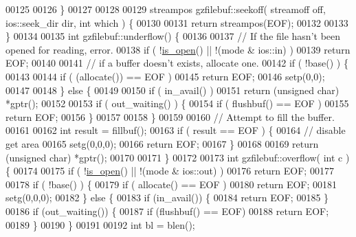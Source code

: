 \begin{DoxyCode}
00125 
00126 \}
00127 
00128 
00129 streampos gzfilebuf::seekoff( streamoff off, ios::seek\_dir dir, \textcolor{keywordtype}{int} which ) \{
00130 
00131   \textcolor{keywordflow}{return} streampos(EOF);
00132 
00133 \}
00134 
00135 \textcolor{keywordtype}{int} gzfilebuf::underflow() \{
00136 
00137   \textcolor{comment}{// If the file hasn't been opened for reading, error.}
00138   \textcolor{keywordflow}{if} ( !\hyperlink{classgzofstream_acb1c9c6dccaf41bc5e44c2263ea48de3}{is\_open}() || !(mode & ios::in) )
00139     \textcolor{keywordflow}{return} EOF;
00140 
00141   \textcolor{comment}{// if a buffer doesn't exists, allocate one.}
00142   \textcolor{keywordflow}{if} ( !base() ) \{
00143 
00144     \textcolor{keywordflow}{if} ( (allocate()) == EOF )
00145       \textcolor{keywordflow}{return} EOF;
00146     setp(0,0);
00147 
00148   \} \textcolor{keywordflow}{else} \{
00149 
00150     \textcolor{keywordflow}{if} ( in\_avail() )
00151       \textcolor{keywordflow}{return} (\textcolor{keywordtype}{unsigned} \textcolor{keywordtype}{char}) *gptr();
00152 
00153     \textcolor{keywordflow}{if} ( out\_waiting() ) \{
00154       \textcolor{keywordflow}{if} ( flushbuf() == EOF )
00155         \textcolor{keywordflow}{return} EOF;
00156     \}
00157 
00158   \}
00159 
00160   \textcolor{comment}{// Attempt to fill the buffer.}
00161 
00162   \textcolor{keywordtype}{int} result = fillbuf();
00163   \textcolor{keywordflow}{if} ( result == EOF ) \{
00164     \textcolor{comment}{// disable get area}
00165     setg(0,0,0);
00166     \textcolor{keywordflow}{return} EOF;
00167   \}
00168 
00169   \textcolor{keywordflow}{return} (\textcolor{keywordtype}{unsigned} \textcolor{keywordtype}{char}) *gptr();
00170 
00171 \}
00172 
00173 \textcolor{keywordtype}{int} gzfilebuf::overflow( \textcolor{keywordtype}{int} c ) \{
00174 
00175   \textcolor{keywordflow}{if} ( !\hyperlink{classgzofstream_acb1c9c6dccaf41bc5e44c2263ea48de3}{is\_open}() || !(mode & ios::out) )
00176     \textcolor{keywordflow}{return} EOF;
00177 
00178   \textcolor{keywordflow}{if} ( !base() ) \{
00179     \textcolor{keywordflow}{if} ( allocate() == EOF )
00180       \textcolor{keywordflow}{return} EOF;
00181     setg(0,0,0);
00182   \} \textcolor{keywordflow}{else} \{
00183     \textcolor{keywordflow}{if} (in\_avail()) \{
00184         \textcolor{keywordflow}{return} EOF;
00185     \}
00186     \textcolor{keywordflow}{if} (out\_waiting()) \{
00187       \textcolor{keywordflow}{if} (flushbuf() == EOF)
00188         \textcolor{keywordflow}{return} EOF;
00189     \}
00190   \}
00191 
00192   \textcolor{keywordtype}{int} bl = blen();

\end{DoxyCode}
